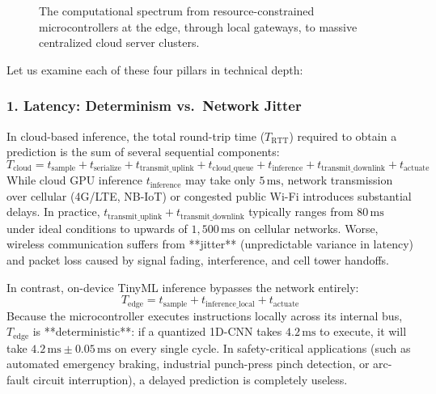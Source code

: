 \begin{figure}[htbp]
\caption{The computational spectrum from resource-constrained microcontrollers at the edge, through local gateways, to massive centralized cloud server clusters.}\label{fig:edge_cloud_spectrum}
\end{figure}

Let us examine each of these four pillars in technical depth:

\subsubsection{1. Latency: Determinism vs.\ Network Jitter}
In cloud-based inference, the total round-trip time ($T_{\text{RTT}}$) required to obtain a prediction is the sum of several sequential components:
\begin{equation}
T_{\text{cloud}} = t_{\text{sample}} + t_{\text{serialize}} + t_{\text{transmit\_uplink}} + t_{\text{cloud\_queue}} + t_{\text{inference}} + t_{\text{transmit\_downlink}} + t_{\text{actuate}}\label{eq:cloud_latency}
\end{equation}
While cloud GPU inference $t_{\text{inference}}$ may take only $5\,\text{ms}$, network transmission over cellular (4G/LTE, NB-IoT) or congested public Wi-Fi introduces substantial delays. In practice, $t_{\text{transmit\_uplink}} + t_{\text{transmit\_downlink}}$ typically ranges from $80\,\text{ms}$ under ideal conditions to upwards of $1{,}500\,\text{ms}$ on cellular networks. Worse, wireless communication suffers from **jitter** (unpredictable variance in latency) and packet loss caused by signal fading, interference, and cell tower handoffs.

In contrast, on-device TinyML inference bypasses the network entirely:
\begin{equation}
T_{\text{edge}} = t_{\text{sample}} + t_{\text{inference\_local}} + t_{\text{actuate}}\label{eq:edge_latency}
\end{equation}
Because the microcontroller executes instructions locally across its internal bus, $T_{\text{edge}}$ is **deterministic**: if a quantized 1D-CNN takes $4.2\,\text{ms}$ to execute, it will take $4.2\,\text{ms} \pm 0.05\,\text{ms}$ on every single cycle. In safety-critical applications (such as automated emergency braking, industrial punch-press pinch detection, or arc-fault circuit interruption), a delayed prediction is completely useless.

